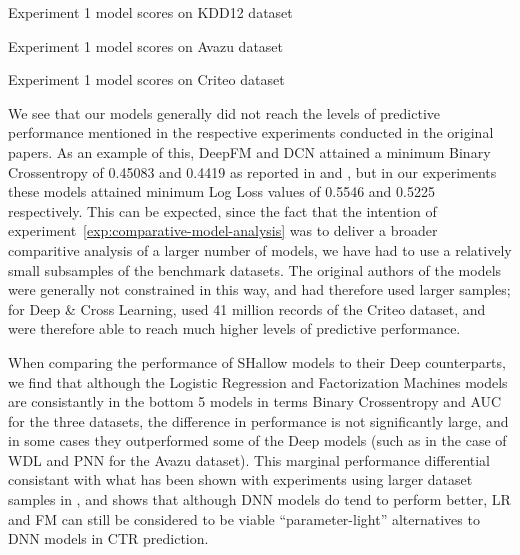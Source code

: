 \documentclass{mldsmsc}
\begin{document}
\begin{table}
    \caption{Experiment 1 model scores on KDD12 dataset}
    \label{tab:exp-1-kdd12}
\end{table}

\begin{table}
    \caption{Experiment 1 model scores on Avazu dataset}
    \label{tab:exp-1-avazu}
\end{table}

\begin{table}
    \caption{Experiment 1 model scores on Criteo dataset}
    \label{tab:exp-1-criteo}
\end{table}

We see that our models generally did not reach the levels
of predictive performance mentioned in the respective experiments conducted in the original papers.
As an example of this, DeepFM and DCN attained a minimum Binary Crossentropy of 0.45083 and 0.4419
as reported in \citep{RefWorks:guo2017deepfm:} and \citep{RefWorks:wang2017deep}, but in
our experiments these models attained minimum Log Loss values of 0.5546 and 0.5225 respectively.
This can be expected, since the fact that the intention of experiment~\ref{exp:comparative-model-analysis}
was to deliver a broader comparitive analysis of a larger number of models, we have had to use
a relatively small subsamples of the benchmark datasets. The original authors of the models were
generally not constrained in this way, and had therefore used larger samples; for Deep \& Cross Learning,
\cite{RefWorks:wang2017deep} used 41 million records of the Criteo dataset, and were therefore able
to reach much higher levels of predictive performance.

When comparing the performance of SHallow models to their Deep 
counterparts, we find that although the Logistic
Regression and Factorization Machines models are consistantly in the
bottom 5 models in terms Binary Crossentropy and AUC for the three datasets,
the difference in performance is not significantly large, and in some cases
they outperformed some of the Deep models (such as in the case of
WDL and PNN for the Avazu dataset). This marginal performance differential consistant with what has been
shown with experiments using larger dataset samples in \citep{RefWorks:guo2017deepfm:,RefWorks:wang2017deep,RefWorks:liu2019feature},
and shows that although DNN models do tend to perform better, LR and FM can
still be considered to be viable ``parameter-light'' alternatives to DNN models
in CTR prediction.
\end{document}

